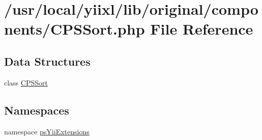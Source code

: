 \hypertarget{CPSSort_8php}{
\section{/usr/local/yiixl/lib/original/components/CPSSort.php File Reference}
\label{CPSSort_8php}
}
\subsection*{Data Structures}
\begin{DoxyCompactItemize}
\item 
class \hyperlink{classCPSSort}{CPSSort}
\end{DoxyCompactItemize}
\subsection*{Namespaces}
\begin{DoxyCompactItemize}
\item 
namespace \hyperlink{namespacepsYiiExtensions}{psYiiExtensions}
\end{DoxyCompactItemize}
